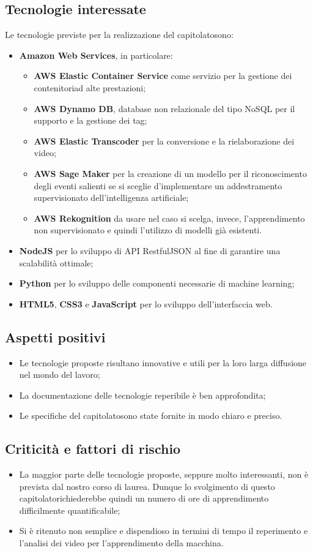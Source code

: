 \subsection{Tecnologie interessate}
Le tecnologie previste per la realizzazione del capitolato\glosp sono:
\begin{itemize}
	\item \textbf{Amazon Web Services}\glo, in particolare:
	\begin{itemize}
		\item \textbf{AWS Elastic Container Service} come servizio per la gestione dei contenitori\glosp ad alte prestazioni;
		\item \textbf{AWS Dynamo DB}, database non relazionale del tipo NoSQL per il supporto e la gestione dei tag;
		\item \textbf{AWS Elastic Transcoder} per la conversione e la rielaborazione dei video;
		\item \textbf{AWS Sage Maker} per la creazione di un modello per il riconoscimento degli eventi salienti se si sceglie d'implementare un addestramento supervisionato dell'intelligenza artificiale\glo;
		\item \textbf{AWS Rekognition} da usare nel caso si scelga, invece, l'apprendimento non supervisionato e quindi l'utilizzo di modelli già esistenti.
	\end{itemize}
	\item \textbf{NodeJS} per lo sviluppo di API Restful\glosp JSON al fine di garantire una scalabilità ottimale;
	\item \textbf{Python} per lo sviluppo delle componenti necessarie di machine learning\glo;
	\item \textbf{HTML5}, \textbf{CSS3} e \textbf{JavaScript} per lo sviluppo dell'interfaccia web. 
\end{itemize}
\subsection{Aspetti positivi}
\begin{itemize}
	\item Le tecnologie proposte risultano innovative e utili per la loro larga diffusione nel mondo del lavoro;
	\item La documentazione delle tecnologie reperibile è ben approfondita;
	\item Le specifiche del capitolato\glosp sono state fornite in modo chiaro e preciso. 
\end{itemize}
\subsection{Criticità e fattori di rischio}
\begin{itemize}
	\item La maggior parte delle tecnologie proposte, seppure molto interessanti, non è prevista dal nostro corso di laurea. Dunque lo svolgimento di questo capitolato\glosp richiederebbe quindi un numero di ore di apprendimento difficilmente quantificabile;
	\item Si è ritenuto non semplice e dispendioso in termini di tempo il reperimento e l'analisi dei video per l'apprendimento della macchina.
\end{itemize}
